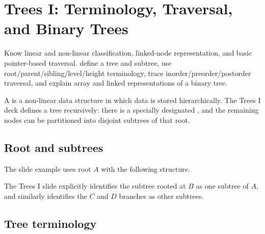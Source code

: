 \chapter{Trees I: Terminology, Traversal, and Binary Trees}\label{ch:trees-i}

\chapterguide%
  {Know linear and non-linear classification, linked-node representation, and basic pointer-based traversal.}
  {define a tree and subtree, use root/parent/sibling/level/height terminology, trace inorder/preorder/postorder traversal, and explain array and linked representations of a binary tree.}

A  is a non-linear data structure in which data is stored hierarchically. The Trees I deck defines a tree recursively: there is a specially designated , and the remaining nodes can be partitioned into disjoint subtrees of that root.

\section{Root and subtrees}

The slide example uses root $A$ with the following structure.

\begin{utpfigure}
\end{utpfigure}

The Trees I slide explicitly identifies the subtree rooted at $B$ as one subtree of $A$, and similarly identifies the $C$ and $D$ branches as other subtrees.

\section{Tree terminology}

